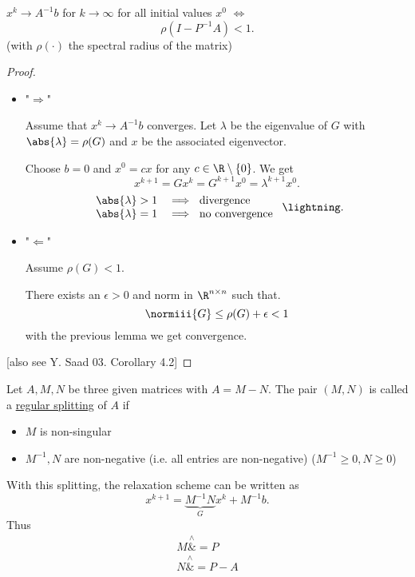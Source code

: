 		\begin{theorem}
		\label{thm:richardconvergencetheorem}
			$x^{k} \rightarrow A^{-1}b$ for $k \rightarrow \infty$ for all initial values $x^{0}$ $\iff$
			\[
				\rho(I-P^{-1}A) < 1
			.\] 
			(with $\rho(\cdot)$ the spectral radius of the matrix)
		\end{theorem}
		\begin{proof}\
		\label{thm:richardconvergencetheoremproof}
		\begin{itemize}
			\item "$\Longrightarrow$" 

				Assume that $x^{k}\rightarrow A^{-1}b$ converges. 
				Let $\lambda $ be the eigenvalue of $G$ with $\abs{\lambda} = \rho(G)$ and $x$ be the associated eigenvector.
				
				Choose $b=0$ and $x^{0}=cx$ for any $c \in \R \setminus \left\{ 0 \right\} $. We get
				\[
				x^{k+1} = Gx^{k} = G^{k+1}x^{0} = \lambda ^{k+1} x^{0}
				.\] 
				\[
					\begin{array}{rl}
						\abs{\lambda } >1 &\implies \text{ divergence } \\
						\abs{\lambda }  = 1 &\implies \text{ no convergence }
				\end{array}
				\lightning
				.\] 
			\item "$\Longleftarrow$"

				Assume $\rho(G)<1$.

				There exists an $\epsilon >0$ and norm in $\R^{n \times n}$ such that.
				\[
					\normiii{G} \leq \rho(G) + \epsilon  < 1
				\] 
				with the previous lemma we get convergence.
		\end{itemize}
		[also see Y. Saad 03. Corollary 4.2]
		\end{proof}

\begin{definition}
\label{thm:additivesplitting}
Let $A, M, N$ be three given matrices with $ A = M-N$. The pair $(M,N)$ is called a \underline{regular splitting} of $A$ if
\begin{itemize}
	\item $M$ is non-singular
	\item $M^{-1}, N$ are non-negative (i.e. all entries are non-negative) ($M^{-1} \geq 0, N \geq 0$)
\end{itemize}
\end{definition}
With this splitting, the relaxation scheme can be written as 
\[
	x^{k+1} = \underbrace{M^{-1}N}_{G} x^{k} + M^{-1}b
.\] 
Thus
\begin{align*}
M \overset{\wedge}&{=} P \\
N \overset{\wedge}&{=} P-A
\end{align*}

